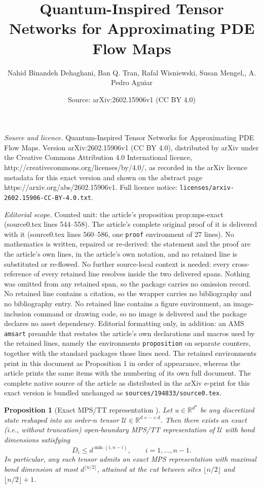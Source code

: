 \documentclass[10pt,a4paper]{amsart}
\title{Quantum-Inspired Tensor Networks for Approximating PDE Flow Maps}
\author{Nahid Binandeh Dehaghani, Ban Q. Tran, Rafal Wisniewski, Susan Mengel,, A. Pedro Aguiar}
\date{Source: arXiv:2602.15906v1 (CC BY 4.0)}
\newtheorem{proposition}{Proposition}
\begin{document}
\maketitle

\noindent\emph{Source and licence.} Quantum-Inspired Tensor Networks for Approximating PDE Flow Maps. Version arXiv:2602.15906v1 (CC BY 4.0), distributed by arXiv under the Creative Commons Attribution 4.0 International licence, http://creativecommons.org/licenses/by/4.0/, as recorded in the arXiv licence metadata for this exact version and shown on the abstract page https://arxiv.org/abs/2602.15906v1. Full licence notice: \texttt{licenses/arxiv-2602.15906-CC-BY-4.0.txt}.\par\smallskip

\noindent\textit{Editorial scope.} Counted unit: the article's proposition prop:mps-exact (source0.tex lines 544--558). The article's complete original proof of it is delivered with it (source0.tex lines 560--586, one \texttt{proof} environment of 27 lines). No mathematics is written, repaired or re-derived: the statement and the proof are the article's own lines, in the article's own notation, and no retained line is substituted or re-flowed.  No further source-local context is needed: every cross-reference of every retained line resolves inside the two delivered spans.  Nothing was omitted from any retained span, so the package carries no omission record.  No retained line contains a citation, so the wrapper carries no bibliography and no bibliography entry.  No retained line contains a figure environment, an image-inclusion command or drawing code, so no image is delivered and the package declares no asset dependency.  Editorial formatting only, in addition: an AMS \texttt{amsart} preamble that restates the article's own declarations and macros used by the retained lines, namely the environments \texttt{proposition} on separate counters, together with the standard packages those lines need.  The retained environments print in this document as Proposition 1 in order of appearance, whereas the article prints the same items with the numbering of its own full document.  The complete native source of the article as distributed in the arXiv e-print for this exact version is bundled unchanged as \texttt{sources/194833/source0.tex}.
\begin{proposition}[Exact MPS/TT representation
]
\label{prop:mps-exact}
Let $u \in \mathbb{R}^{d^n}$ be any discretized state reshaped into an order-$n$
tensor $\mathcal{U} \in \mathbb{R}^{d \times \cdots \times d}$. Then there exists
an exact (i.e., without truncation) open-boundary MPS/TT representation of $\mathcal{U}$ with bond
dimensions satisfying
\[
D_i \le d^{\min(i,n-i)}, \qquad i=1,\dots,n-1.
\]
In particular, any such tensor admits an exact MPS representation with maximal
bond dimension at most $d^{\lfloor n/2 \rfloor}$, attained at the cut between
sites $\lfloor n/2 \rfloor$ and $\lfloor n/2 \rfloor+1$.
\end{proposition}
\end{document}

